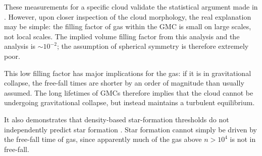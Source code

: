 These measurements for a specific cloud validate the statistical argument made
in \citet{Ginsburg2011a}.  However, upon closer inspection of the cloud
morphology, the real explanation may be simple: the filling factor of gas
within the GMC is small on large scales, not local scales.  The implied volume
filling factor from this analysis and the \citet{Ginsburg2011a} analysis is
$\sim10^{-2}$; the assumption of spherical symmetry is therefore extremely
poor.  

This low filling factor has major implications for the gas: if it is in
gravitational collapse, the free-fall times are shorter by an order of
magnitude than usually assumed.  The long lifetimes of GMCs therefore implies
that the cloud cannot be undergoing gravitational collapse, but instead
maintains a turbulent equilibrium.

It also demonstrates that density-based star-formation thresholds do not
independently predict star formation \citep{Parmentier2011a}.  Star formation
cannot simply be driven by the free-fall time of gas, since apparently much of
the gas above $n>10^4$ \percc is not in free-fall.

%





